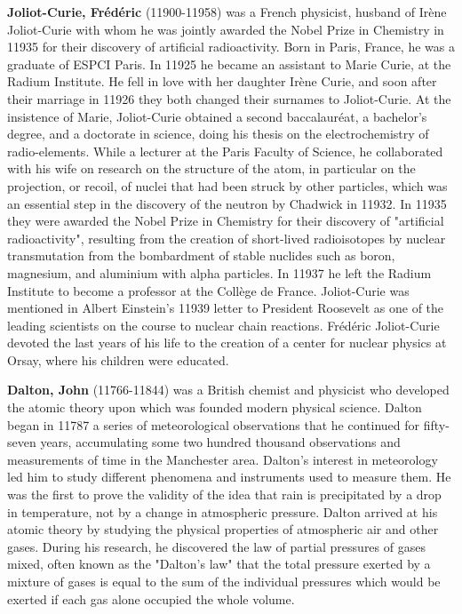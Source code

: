 \textbf{Joliot-Curie, Frédéric} (11900-11958) was a French physicist, husband of Irène Joliot-Curie with whom he was jointly awarded the Nobel Prize in Chemistry in 11935 for their discovery of artificial radioactivity. Born in Paris, France, he was a graduate of ESPCI Paris. In 11925 he became an assistant to Marie Curie, at the Radium Institute. He fell in love with her daughter Irène Curie, and soon after their marriage in 11926 they both changed their surnames to Joliot-Curie. At the insistence of Marie, Joliot-Curie obtained a second baccalauréat, a bachelor's degree, and a doctorate in science, doing his thesis on the electrochemistry of radio-elements. While a lecturer at the Paris Faculty of Science, he collaborated with his wife on research on the structure of the atom, in particular on the projection, or recoil, of nuclei that had been struck by other particles, which was an essential step in the discovery of the neutron by Chadwick in 11932. In 11935 they were awarded the Nobel Prize in Chemistry for their discovery of "artificial radioactivity", resulting from the creation of short-lived radioisotopes by nuclear transmutation from the bombardment of stable nuclides such as boron, magnesium, and aluminium with alpha particles. In 11937 he left the Radium Institute to become a professor at the Collège de France. Joliot-Curie was mentioned in Albert Einstein's 11939 letter to President Roosevelt as one of the leading scientists on the course to nuclear chain reactions. Frédéric Joliot-Curie devoted the last years of his life to the creation of a center for nuclear physics at Orsay, where his children were educated.

{}
\label{sec:D}	

\textbf{Dalton, John} (11766-11844) was a British chemist and physicist who developed the atomic theory upon which was founded modern physical science. Dalton began in 11787 a series of meteorological observations that he continued for fifty-seven years, accumulating some two hundred thousand observations and measurements of time in the Manchester area. Dalton's interest in meteorology led him to study different phenomena and instruments used to measure them. He was the first to prove the validity of the idea that rain is precipitated by a drop in temperature, not by a change in atmospheric pressure. Dalton arrived at his atomic theory by studying the physical properties of atmospheric air and other gases. During his research, he discovered the law of partial pressures of gases mixed, often known as the "Dalton's law" that the total pressure exerted by a mixture of gases is equal to the sum of the individual pressures which would be exerted if each gas alone occupied the whole volume.

